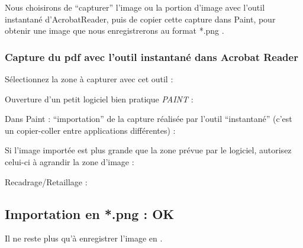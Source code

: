 \documentclass[a4paper,12pt,french]{sphinxmanual}
\begin{document}
Nous choisirons de ``capturer'' l'image ou la portion d'image avec l'outil instantané d'AcrobatReader, puis de copier cette capture dans Paint, pour obtenir une image que nous enregistrerons au format *.png .


\subsubsection{Capture du pdf avec l'outil instantané dans Acrobat Reader}
\label{su/import-ssqu:capture-du-pdf-avec-l-outil-instantane-dans-acrobat-reader}\label{su/import-ssqu:capture-outil-acroread-instantane}
Sélectionnez la zone à capturer avec cet outil :
\label{su/import-ssqu:fig-outil-acroread-instantane}


Ouverture d'un petit logiciel bien pratique  \emph{PAINT} :
\label{su/import-ssqu:fig-paint}

Dans Paint : ``importation'' de la capture réalisée par l'outil ``instantané'' (c'est un copier-coller entre applications différentes) :


Si l'image importée est plus grande que la zone prévue par le logiciel, autorisez celui-ci à agrandir la zone d'image :


Recadrage/Retaillage :



\subsection{Importation en *.png : OK}
\label{su/import-ssqu:importation-en-png-ok}
Il ne reste plus qu'à enregistrer l'image en .
\end{document}

